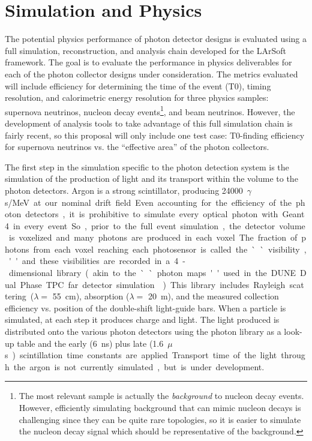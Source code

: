 \section{Simulation and Physics}
\label{sec:fdsp-pd-simphys}

The potential physics performance of photon detector designs is evaluated using a full simulation, reconstruction, and analysis chain developed for the LArSoft framework. The goal is to evaluate the performance in physics deliverables for each of the photon collector designs under consideration. The metrics evaluated will include efficiency for determining the time of the event (T0), timing resolution, and calorimetric energy resolution for three physics samples: supernova neutrinos, nucleon decay events\footnote{The most relevant sample is actually the \emph{background} to nucleon decay events. However, efficiently simulating background that can mimic nucleon decays is challenging since they can be quite rare topologies, so it is easier to simulate the nucleon decay signal which should be representative of the background.}, and beam neutrinos. However, the development of analysis tools to take advantage of this full simulation chain is fairly recent, so this proposal will only include one test case: T0-finding efficiency for supernova neutrinos vs. the ``effective area'' of the photon collectors.

The first step in the simulation specific to the photon detection system is the simulation of the production of light and its transport within the volume to the photon detectors. Argon is a strong scintillator, producing \SI{24000}{$\gamma$s/MeV} at our nominal drift field. Even accounting for the efficiency of the photon detectors, it is prohibitive to simulate every optical photon with Geant4 in every event. So, prior to the full event simulation, the detector volume is voxelized and many photons are produced in each voxel. The fraction of photons from each voxel reaching each photosensor is called the ``visibility,'' and these visibilities are recorded in a 4-dimensional library (akin to the ``photon maps'' used in the DUNE Dual Phase TPC far detector simulation\cite{}). This library includes Rayleigh scattering ($\lambda=$ \SI{55}{cm}), absorption ($\lambda=$ \SI{20}{m}), and the measured collection efficiency vs. position of the double-shift light-guide bars. When a particle is simulated, at each step it produces charge and light. The light produced is distributed onto the various photon detectors using the photon library as a look-up table and the early (\SI{6}{ns}) plus late (\SI{1.6}{$\mu$s}) scintillation time constants are applied. Transport time of the light through the argon is not currently simulated, but is under development.

